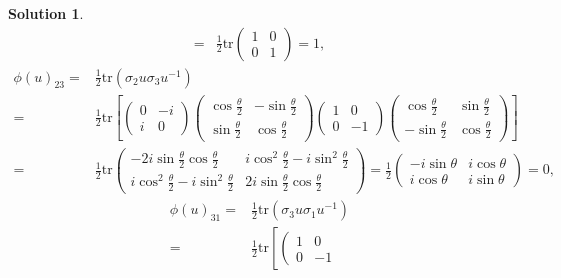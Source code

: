 \documentclass[UTF8,10pt,a4paper]{article}
\theoremstyle{Problem}
\theoremstyle{Solution}
\newtheorem*{sol}{Solution}
\begin{document}
\begin{sol}
\begin{align}
        =&\frac{1}{2}\text{tr}\left(\begin{matrix}
            1&0\\
            0&1
        \end{matrix}\right)=1,
    \end{align}
    \begin{align}
        \nonumber\phi(u)_{23}=&\frac{1}{2}\text{tr}(\sigma_2u\sigma_3u^{-1})\\
        \nonumber=&\frac{1}{2}\text{tr}\left[\left(\begin{matrix}
            0&-i\\
            i&0
        \end{matrix}\right)\left(\begin{matrix}
            \cos\frac{\theta}{2}&-\sin\frac{\theta}{2}\\
            \sin\frac{\theta}{2}&\cos\frac{\theta}{2}
        \end{matrix}\right)\left(\begin{matrix}
            1&0\\
            0&-1
        \end{matrix}\right)\left(\begin{matrix}
            \cos\frac{\theta}{2}&\sin\frac{\theta}{2}\\
            -\sin\frac{\theta}{2}&\cos\frac{\theta}{2}
        \end{matrix}\right)\right]\\
        =&\frac{1}{2}\text{tr}\left(\begin{matrix}
            -2i\sin\frac{\theta}{2}\cos\frac{\theta}{2}&i\cos^2\frac{\theta}{2}-i\sin^2\frac{\theta}{2}\\
            i\cos^2\frac{\theta}{2}-i\sin^2\frac{\theta}{2}&2i\sin\frac{\theta}{2}\cos\frac{\theta}{2}
        \end{matrix}\right)=\frac{1}{2}\left(\begin{matrix}
            -i\sin\theta&i\cos\theta\\
            i\cos\theta&i\sin\theta
        \end{matrix}\right)=0,
    \end{align}
    \begin{align}
        \nonumber\phi(u)_{31}=&\frac{1}{2}\text{tr}(\sigma_3u\sigma_1u^{-1})\\
        \nonumber=&\frac{1}{2}\text{tr}\left[\left(\begin{matrix}
            1&0\\
            0&-1

\end{matrix}
\end{align}
\end{sol}
\end{document}
